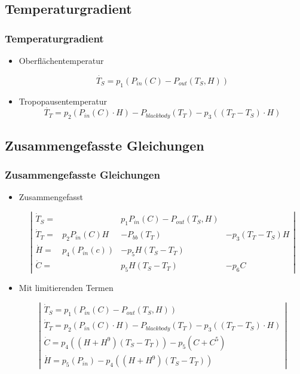 \documentclass{beamer}
\begin{document}
\subsection{Temperaturgradient}

\begin{frame}
	\frametitle{Temperaturgradient}
	\begin{itemize}
		\item[] Oberflächentemperatur
		
			\begin{equation}
			\dot{T_S} = p_1 \left( P_{in}(C) - P_{out}(T_S, H) \right)
			\end{equation}
		\item[] Tropopausentemperatur
			\begin{equation}	
			\dot{T_T} = p_2 \left( P_{in}(C) \cdot H \right) - P_{blackbody}(T_T) - p_3 \left( (T_T - T_S) \cdot H \right)
			\end{equation}		
		
	\end{itemize}
\end{frame}

\subsection{Zusammengefasste Gleichungen}

\begin{frame}
\frametitle{Zusammengefasste Gleichungen}
\begin{itemize}
	\item[] Zusammengefasst
	
\begin{equation}
\left|
\begin{matrix}
\dot{T}_S = & & p_1 P_{in}(C) - P_{out}(T_S, H)   & \\
\dot{T}_T = & p_2 P_{in}(C) H   & - P_{bb}(T_T) & - p_3 (T_T - T_S) H \\
\dot{H}   = & p_4 (P_{in}(c)) & - p_5 H (T_S - T_T) & \\
\dot{C}   = &              &   p_5 H (T_S - T_T)  & - p_6 C
\end{matrix}
\right|
\end{equation}
	
	\pause
	
	\item[] Mit limitierenden Termen
	
\begin{equation}
\left|
\begin{array}{lcl}
\dot{T}_S = p_1 \left( P_{in}(C) - P_{out}(T_S, H) \right) \\
\dot{T}_T = p_2 \left( P_{in}(C) \cdot H \right) - P_{blackbody}(T_T) - p_3 \left( (T_T - T_S) \cdot H \right) \\
\dot{C} = p_4 \left( (H + H^9)(T_S - T_T) \right) - p_5 (C + C^5) \\
\dot{H} = p_5 \left(P_{in} \right) - p_4 \left( (H + H^9 )(T_S - T_T) \right)
\end{array}
\right|
\end{equation}

\end{itemize}
\end{frame}
\end{document}
